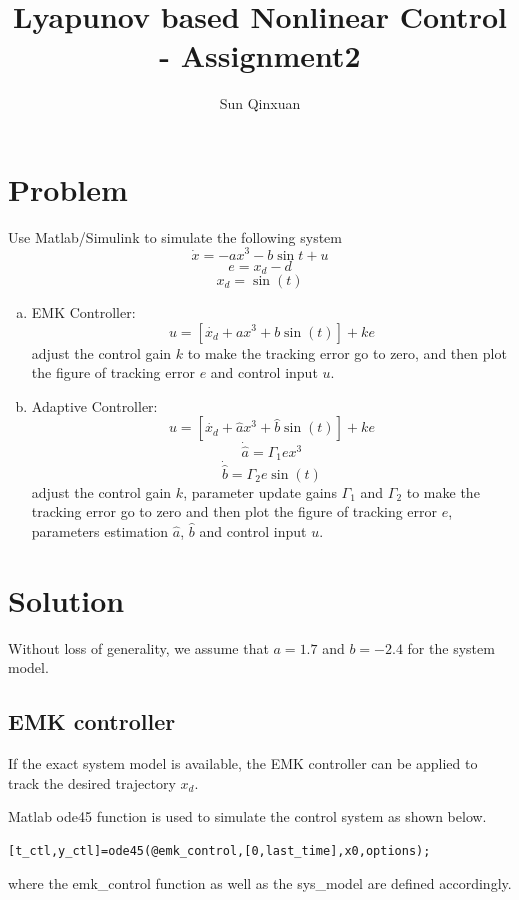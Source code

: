 \documentclass[12pt,a4paper]{article}
\title{Lyapunov based Nonlinear Control - Assignment2}
\author{Sun Qinxuan}
\begin{document}
\maketitle

\section{Problem}

\indent Use Matlab/Simulink to simulate the following system
$$\dot{x}=-ax^3-b\sin{t}+u$$
$$e=x_d-d$$
$$x_d=\sin(t)$$
\begin{enumerate}[a)]
\item EMK Controller:
      $$u=[\dot{x_d}+ax^3+b\sin(t)]+ke$$
      adjust the control gain $k$ to make the tracking error go to zero, and then plot the figure of tracking error $e$ and control input $u$.
\item Adaptive Controller:
      $$u=[\dot{x_d}+\hat{a}x^3+\hat{b}\sin(t)]+ke$$
      $$\dot{\hat{a}}=\Gamma_1ex^3$$
      $$\dot{\hat{b}}=\Gamma_2e\sin(t)$$
      adjust the control gain $k$, parameter update gains $\Gamma_1$ and $\Gamma_2$ to make the tracking error go to zero and then plot the figure of tracking error $e$, parameters estimation $\hat{a}$, $\hat{b}$ and control input $u$.
\end{enumerate}

\section{Solution}

\indent Without loss of generality, we assume that $a=1.7$ and $b=-2.4$ for the system model.

\subsection{EMK controller}

\indent If the exact system model is available, the EMK controller can be applied to track the desired trajectory $x_d$. 

\indent Matlab ode45 function is used to simulate the control system as shown below.

\begin{lstlisting}
[t_ctl,y_ctl]=ode45(@emk_control,[0,last_time],x0,options);
\end{lstlisting}

where the emk\_control function as well as the sys\_model are defined accordingly.
\end{document}
